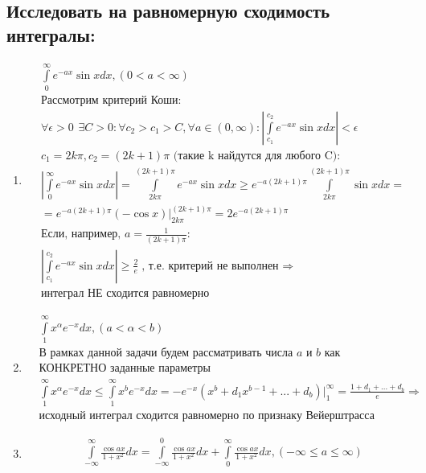 \documentclass[a4paper, 12pt]{article}
\begin{document}
\subsection{Исследовать на равномерную сходимость интегралы:}
\begin{enumerate}
 \item 
 \begin{align*}
  &\int\limits_0^\infty e^{-ax}\sin x dx, (0<a<\infty) \\
  &\text{Рассмотрим критерий Коши:} \\
  &\forall \epsilon > 0 \hspace{5pt} \exists C>0 : \forall c_2>c_1>C, \forall a\in(0,\infty):
  \left|\int\limits_{c_1}^{c_2} e^{-ax}\sin x dx \right| < \epsilon \\
  &c_1 = 2k\pi, c_2 = (2k+1)\pi \text{ (такие k найдутся для любого C)}: \\
  &\left|\int\limits_0^\infty e^{-ax}\sin x dx \right| = 
  \int\limits_{2k\pi}^{(2k+1)\pi} e^{-ax}\sin x dx \geq
  e^{-a(2k+1)\pi}\int\limits_{2k\pi}^{(2k+1)\pi}\sin x dx = \\
  &=e^{-a(2k+1)\pi}\left(-\cos x\right)\Big|_{2k\pi}^{(2k+1)\pi} = 
  2e^{-a(2k+1)\pi} \\
  &\text{Если, например, $a=\frac{1}{(2k+1)\pi}$}: \\
  &\left|\int\limits_{c_1}^{c_2} e^{-ax}\sin x dx \right| \geq \frac{2}{e}
  \text{, т.е. критерий не выполнен $\Rightarrow$} \\
  &\text{интеграл НЕ сходится равномерно}
  \end{align*}
\item
\begin{align*}
 &\int\limits_1^\infty x^\alpha e^{-x}dx, (a<\alpha<b) \\ 
 &\text{В рамках данной задачи будем рассматривать числа $a$ и $b$ как} \\
 &\text{КОНКРЕТНО заданные параметры} \\
 &\int\limits_1^\infty x^\alpha e^{-x}dx \leq \int\limits_1^\infty x^b e^{-x}dx = 
 -e^{-x}(x^b+d_1x^{b-1}+...+d_b)\Big|_1^\infty = 
 \frac{1+d_1+...+d_b}{e} \Rightarrow \\
 &\text{исходный интеграл сходится равномерно по признаку Вейерштрасса}
\end{align*}
\item
\begin{align*}
 &\int\limits_{-\infty}^\infty \frac{\cos ax}{1+x^2}dx =
 \int\limits_{-\infty}^0 \frac{\cos ax}{1+x^2}dx + 
 \int\limits_0^\infty \frac{\cos ax}{1+x^2}dx, (-\infty \leq a \leq \infty) \\

\end{align*}
\end{enumerate}
\end{document}
